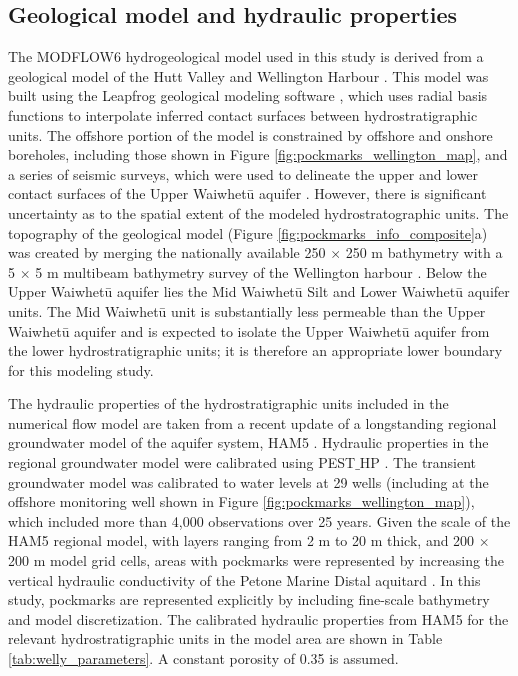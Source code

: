 \documentclass[pdflatex,sn-apa]{sn-jnl}%
\begin{document}
\subsection{Geological model and hydraulic properties}
The MODFLOW6 hydrogeological model used in this study is derived from a geological model of the Hutt Valley and Wellington Harbour \citep{begg_revised_2023}.
This model was built using the Leapfrog geological modeling software \citep{seequent_ltd_leapfrog_2020},
which uses radial basis functions to interpolate inferred contact surfaces between hydrostratigraphic units.
The offshore portion of the model is constrained by offshore and onshore boreholes, including those shown in Figure \ref{fig:pockmarks_wellington_map},
and a series of seismic surveys, which were used to delineate the upper and lower contact surfaces of the Upper Waiwhetū aquifer \citep{stantec_gear_2022, begg_lower_2020}.
However, there is significant uncertainty as to the spatial extent of the modeled hydrostratographic units.
The topography of the geological model (Figure \ref{fig:pockmarks_info_composite}a) was created by merging the nationally available 250 $\times$ 250 m bathymetry \citep{niwa_new_2016} with a 5 $\times$ 5 m multibeam bathymetry survey of the Wellington harbour \citep{hoffmann_fresh_2023}.
Below the Upper Waiwhetū aquifer lies the Mid Waiwhetū Silt and Lower Waiwhetū aquifer units.
The Mid Waiwhetū unit is substantially less permeable than the Upper Waiwhetū aquifer and is expected to isolate the Upper Waiwhetū aquifer from the lower hydrostratigraphic units;
it is therefore an appropriate lower boundary for this modeling study.

The hydraulic properties of the hydrostratigraphic units included in the numerical flow model are taken from a recent update of a longstanding regional groundwater model of the aquifer system,
HAM5 \citep{bennett_hutt_2024}.
Hydraulic properties in the regional groundwater model were calibrated using PEST$\_$HP \citep{doherty_pest_hp_2017}.
The transient groundwater model was calibrated to water levels at 29 wells (including at the offshore monitoring well shown in Figure \ref{fig:pockmarks_wellington_map}),
which included more than 4,000 observations over 25 years.
Given the scale of the HAM5 regional model, with layers ranging from 2 m to 20 m thick, and 200 $\times$ 200 m model grid cells,
areas with pockmarks were represented by increasing the vertical hydraulic conductivity of the Petone Marine Distal aquitard \citep{kaleris_modelling_2002}.
In this study, pockmarks are represented explicitly by including fine-scale bathymetry and model discretization.
The calibrated hydraulic properties from HAM5 for the relevant hydrostratigraphic units in the model area are shown in Table \ref{tab:welly_parameters}.
A constant porosity of 0.35 is assumed.
\end{document}
